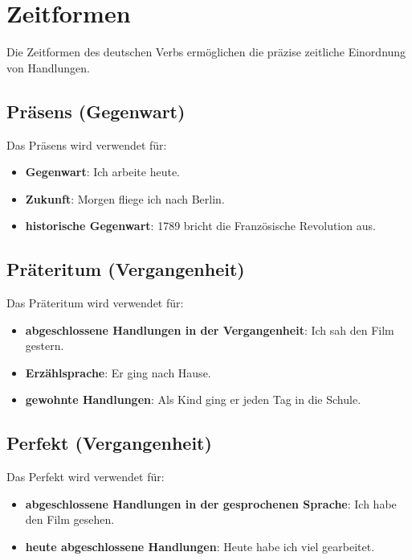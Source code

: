 \chapter{Zeitformen}
\label{cha:Zeitformen}

Die Zeitformen des deutschen Verbs ermöglichen die präzise zeitliche Einordnung von Handlungen.

\section{Präsens (Gegenwart)}
\label{sec:Praesens}

Das Präsens wird verwendet für:
\begin{itemize}
    \item \textbf{Gegenwart}: Ich arbeite heute.
    \item \textbf{Zukunft}: Morgen fliege ich nach Berlin.
    \item \textbf{historische Gegenwart}: 1789 bricht die Französische Revolution aus.
\end{itemize}

\section{Präteritum (Vergangenheit)}
\label{sec:Praeteritum}

Das Präteritum wird verwendet für:
\begin{itemize}
    \item \textbf{abgeschlossene Handlungen in der Vergangenheit}: Ich sah den Film gestern.
    \item \textbf{Erzählsprache}: Er ging nach Hause.
    \item \textbf{gewohnte Handlungen}: Als Kind ging er jeden Tag in die Schule.
\end{itemize}

\section{Perfekt (Vergangenheit)}
\label{sec:Perfekt}

Das Perfekt wird verwendet für:
\begin{itemize}
    \item \textbf{abgeschlossene Handlungen in der gesprochenen Sprache}: Ich habe den Film gesehen.
    \item \textbf{heute abgeschlossene Handlungen}: Heute habe ich viel gearbeitet.
\end{itemize}

